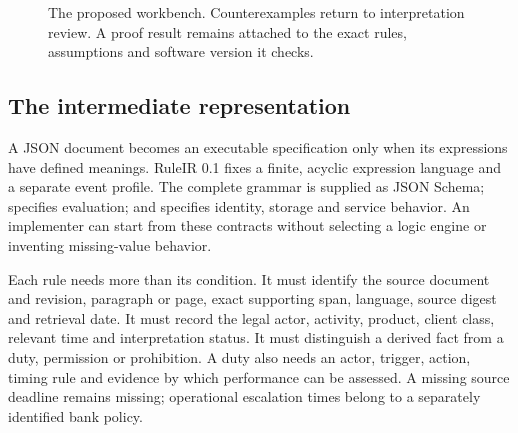 \begin{figure}[htbp]
\centering
{}
\caption{The proposed workbench. Counterexamples return to interpretation review.
A proof result remains attached to the exact rules, assumptions and software
version it checks.}
\label{fig:architecture}
\end{figure}

\subsection{The intermediate representation}

A JSON document becomes an executable specification only when its expressions
have defined meanings. RuleIR 0.1 fixes a finite, acyclic expression language and
a separate event profile. The complete grammar is supplied as JSON Schema;
 specifies evaluation; and
 specifies identity, storage and service
behavior. An implementer can start from these contracts without selecting a
logic engine or inventing missing-value behavior.

Each rule needs more than its condition. It must identify the source document and
revision, paragraph or page, exact supporting span, language, source digest and
retrieval date. It must record the legal actor, activity, product, client class,
relevant time and interpretation status. It must distinguish a derived fact from
a duty, permission or prohibition. A duty also needs an actor, trigger, action,
timing rule and evidence by which performance can be assessed. A missing source
deadline remains missing; operational escalation times belong to a separately
identified bank policy.

